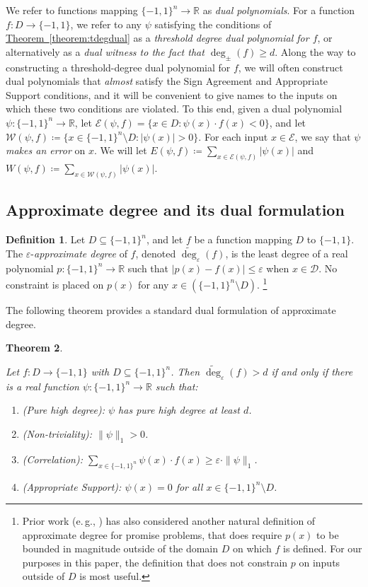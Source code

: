 \documentclass[11pt]{article}
\numberwithin{equation}{section}
\newtheorem{theorem}{Theorem}[section]
\theoremstyle{definition}
\newtheorem{definition}[theorem]{Definition}
\theoremstyle{plain}
\newcommand{\R}{\mathbb R}
\newcommand{\eg}{e.\,g.}
\newcommand{\expref}[2]{\hyperref[#2]{#1~\ref{#2}}}
\newcommand{\bits}{\{-1,1\}}
\newcommand{\eps}{\varepsilon}
\newcommand{\adeg}{\widetilde{\operatorname{deg}}}
\begin{document}
We refer to functions mapping $\bits^n \to \R$ as \emph{dual polynomials}. 
For a function $f \colon D \to \bits$, we refer to any $\psi$ satisfying the
%
conditions %
of \expref{Theorem}{theorem:tdegdual} as a \emph{threshold
	degree dual polynomial for $f$}, or alternatively as a \emph{dual witness to the fact that $\deg_{\pm}(f) \geq d$}.
Along the way to constructing a threshold-degree %
 dual polynomial for $f$, we will often construct dual polynomials
that \emph{almost} satisfy the Sign Agreement and Appropriate Support conditions, and it will be convenient
to give names to the inputs on which these two conditions are violated. To this end,
given a dual polynomial $\psi \colon \bits^n \to \R$, let $\mathcal{E}(\psi, f) = \{x \in D \colon \psi(x) \cdot f(x) < 0\}$, 
and let $\mathcal{W}(\psi, f) \coloneqq  \{x \in \bits^n \setminus D \colon |\psi(x)| > 0\}$. For each input $x \in \mathcal{E}$,
we say that $\psi$ \emph{makes an error} on $x$.
We will let $E(\psi, f) \coloneqq  \sum_{x \in \mathcal{E}(\psi, f)} |\psi(x)|$
and $W(\psi, f) \coloneqq  \sum_{x \in \mathcal{W}(\psi, f)} |\psi(x)|$.


\subsection{Approximate degree and its dual formulation}
\begin{definition} \label{def:adeg}
	Let $D \subseteq \{-1, 1\}^n$, and let $f$ be a function mapping $D$ to $\{-1,1\}$.
	The $\eps$-\emph{approximate degree} of $f$, denoted $\adeg_{\eps}(f)$, is the least degree of a real polynomial $p \colon \bits^n \to \R$ such that $|p(x) -f(x)| \leq \eps$ when $x \in \mathcal{D}$.
	No constraint is placed on $p(x)$ for any $x \in (\bits^n \setminus D)$.%
%
\footnote{Prior work (\eg, \cite{aaronsonshi, bkt}) has also considered  %
another natural definition of approximate degree for promise problems, that does require $p(x)$ to be bounded in magnitude outside
of the domain $D$ on which $f$ is defined. For our purposes
in this paper, the definition that does not constrain
$p$ on inputs outside of $D$ is most useful.}
\end{definition}


The following theorem provides a standard dual formulation of approximate degree.
\begin{theorem}\label{theorem:adegdual}
	
	Let $f:D \to \{-1,1\}$ with $D \subseteq \{-1,1\}^n$. Then $\adeg_{\eps}(f) > d$ if and only if there is a real function $\psi: \bits^n \to \R$ such that:
	\begin{enumerate}
		\item (Pure high degree): $\psi$ has pure high degree at least $d$.
		\item (Non-triviality): $\|\psi\|_1 > 0$.
		\item (Correlation): $\sum_{x\in\bits^n} \psi(x) \cdot f(x) \geq \eps \cdot \|\psi\|_1$.
		\item (Appropriate Support): $\psi(x)=0$ for all $x \in \bits^n \setminus D$.
	\end{enumerate}
\end{theorem}
\end{document}
